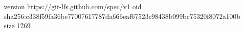 version https://git-lfs.github.com/spec/v1
oid sha256:c338f59fa36be77007617787da666eaf67523e98438b099bc75320f8072a100b
size 1269
